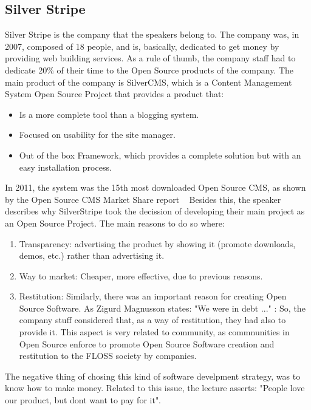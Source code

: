 \documentclass[11pt]{article}
\begin{document}
\subsection{Silver Stripe}
Silver Stripe is the company that the speakers belong to. The company was, in 2007, composed of 18 people, and is, basically, dedicated to get money by providing web building services.
As a rule of thumb, the company staff had to dedicate 20\% of their time to the Open Source products of the company.
The main product of the company is SilverCMS, which is a Content Management System Open Source Project that provides a product that:
\begin{itemize}\itemsep0pt
\item{Is a more complete tool than a blogging system}.
\item{Focused on usability for the site manager}.
\item{Out of the box Framework, which provides a complete solution but with an easy installation process}.
\end{itemize}
In 2011, the system was the 15th most downloaded Open Source CMS, as shown by the Open Source CMS Market Share report ~\cite{CMS00}
Besides this, the speaker describes why SilverStripe took the decission of developing their main project as an Open Source Project. The main reasons to do so where:
\begin{enumerate}\itemsep0pt
\item{Transparency}: advertising the product by showing it (promote downloads, demos, etc.) rather than advertising it.
\item{Way to market}: Cheaper, more effective, due to previous reasons.
\item{Restitution}: Similarly, there was an important reason for creating Open Source Software. As Zigurd Magnusson states:
"We were in debt ..." : So, the company stuff considered that, as a way of restitution, they had also to provide it.  This aspect is very related to community, as commnunities in Open Source enforce to promote Open Source Software creation and restitution to the FLOSS society by companies.
\end{enumerate}
The negative thing of chosing this kind of software develpment strategy, was to know how to make money. Related to this issue, the lecture asserts: "People love our product, but dont want to pay for it".
\end{document}
